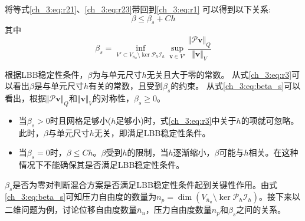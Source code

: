 将等式\eqref{ch_3:eq:r21}、\eqref{ch_3:eq:r23}带回到\eqref{ch_3:eq:r1} 可以得到以下关系:
\begin{equation}\label{ch_3:eq:r3}
    \beta \le \beta_s + Ch
\end{equation}
其中
\begin{equation}\label{ch_3:eq:beta_s}
    \beta_s = \inf_{V'\subset V_{\bar{n}_u}\setminus\ker \mathcal P_h \mathcal I_h}\sup_{\boldsymbol v \in V'}\frac{\Vert \mathcal P \boldsymbol v\Vert_Q}{\Vert  \boldsymbol v\Vert_V} 
\end{equation}

根据LBB稳定性条件，$\beta$为与单元尺寸$h$无关且大于零的常数。
从式\eqref{ch_3:eq:r3}可以看出$\beta$是与单元尺寸$h$有关的常数，且受到$\beta_s$的约束。
从式\eqref{ch_3:eq:beta_s}可以看出，根据$\Vert \mathcal P \boldsymbol v\Vert_Q$和$\Vert \boldsymbol v\Vert_V$的对称性，$\beta_s\geq 0$。
\begin{itemize}
    \item 当$\beta_s> 0$时且网格足够小($h$足够小)时，式\eqref{ch_3:eq:r3}中关于$h$的项就可忽略。此时，$\beta$与单元尺寸$h$无关，即满足LBB稳定性条件。
    \item 当$\beta_s= 0$时，$\beta\leq Ch$。$\beta$受到$h$的限制，当$h$逐渐缩小，$\beta$可能与$h$相关。在这种情况下不能确保其是否满足LBB稳定性条件。
\end{itemize}

$\beta_s$是否为零对判断混合方案是否满足LBB稳定性条件起到关键性作用。由式\eqref{ch_3:eq:beta_s}可知压力自由度的数量为$ n_p = \dim(V_{\bar{n}_u}\setminus\ker \mathcal P_h \mathcal I_h)$。接下来以二维问题为例，讨论位移自由度数量$\bar{n}_u$，压力自由度数量$n_p$和$\beta_s$之间的关系。

